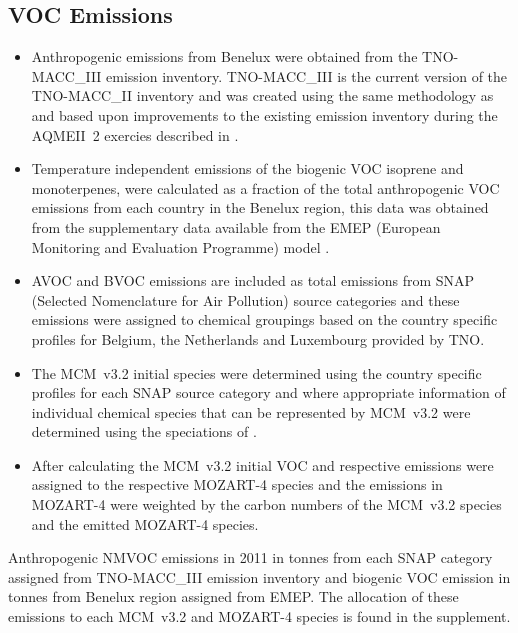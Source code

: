 \subsection{VOC Emissions} \label{ss:VOC_emissions}
\begin{itemize}
    \item Anthropogenic emissions from Benelux were obtained from the TNO-MACC\_III emission inventory. TNO-MACC\_III is the current version of the TNO-MACC\_II inventory and was created using the same methodology as \citep{Kuenen:2014} and based upon improvements to the existing emission inventory during the AQMEII~2 exercies described in \citet{Pouliot:2015}. 
    \item Temperature independent emissions of the biogenic VOC isoprene and monoterpenes, were calculated as a fraction of the total anthropogenic VOC emissions from each country in the Benelux region, this data was obtained from the supplementary data available from the EMEP (European Monitoring and Evaluation Programme) model \citep{Simpson:2012}.
    \item AVOC and BVOC emissions are included as total emissions from SNAP (Selected Nomenclature for Air Pollution) source categories and these emissions were assigned to chemical groupings based on the country specific profiles for Belgium, the Netherlands and Luxembourg provided by TNO.
    \item The MCM~v3.2 initial species were determined using the country specific profiles for each SNAP source category and where appropriate information of individual chemical species that can be represented by MCM~v3.2 were determined using the speciations of \citet{Passant:2002}. %
    \item After calculating the MCM~v3.2 initial VOC and respective emissions were assigned to the respective MOZART-4 species and the emissions in MOZART-4 were weighted by the carbon numbers of the MCM~v3.2 species and the emitted MOZART-4 species.
\end{itemize}
{%
    \renewcommand{\arraystretch}{1.1}%
    \begin{table}%
        \centering%
        \caption{Anthropogenic NMVOC emissions in 2011 in tonnes from each SNAP category assigned from TNO-MACC\_III emission inventory and biogenic VOC emission in tonnes from Benelux region assigned from EMEP. The allocation of these emissions to each MCM~v3.2 and MOZART-4 species is found in the supplement.}%
        
    \end{table}%
}

